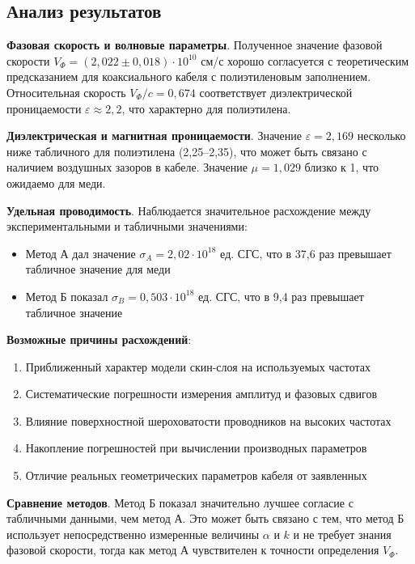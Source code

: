 \documentclass[a4paper]{article}
\begin{document}
\subsection*{Анализ результатов}

\textbf{Фазовая скорость и волновые параметры}. Полученное значение фазовой скорости $V_\Phi = (2,022 \pm 0,018) \cdot 10^{10}$ см/с хорошо согласуется с теоретическим предсказанием для коаксиального кабеля с полиэтиленовым заполнением. Относительная скорость $V_\Phi/c = 0,674$ соответствует диэлектрической проницаемости $\varepsilon \approx 2,2$, что характерно для полиэтилена.

\textbf{Диэлектрическая и магнитная проницаемости}. Значение $\varepsilon = 2,169$ несколько ниже табличного для полиэтилена (2,25--2,35), что может быть связано с наличием воздушных зазоров в кабеле. Значение $\mu = 1,029$ близко к 1, что ожидаемо для меди.

\textbf{Удельная проводимость}. Наблюдается значительное расхождение между экспериментальными и табличными значениями:
\begin{itemize}
\item Метод А дал значение $\sigma_A = 2,02 \cdot 10^{18}$ ед. СГС, что в 37,6 раз превышает табличное значение для меди
\item Метод Б показал $\sigma_B = 0,503 \cdot 10^{18}$ ед. СГС, что в 9,4 раз превышает табличное значение
\end{itemize}

\textbf{Возможные причины расхождений}:
\begin{enumerate}
\item Приближенный характер модели скин-слоя на используемых частотах
\item Систематические погрешности измерения амплитуд и фазовых сдвигов
\item Влияние поверхностной шероховатости проводников на высоких частотах
\item Накопление погрешностей при вычислении производных параметров
\item Отличие реальных геометрических параметров кабеля от заявленных
\end{enumerate}

\textbf{Сравнение методов}. Метод Б показал значительно лучшее согласие с табличными данными, чем метод А. Это может быть связано с тем, что метод Б использует непосредственно измеренные величины $\alpha$ и $k$ и не требует знания фазовой скорости, тогда как метод А чувствителен к точности определения $V_\Phi$.
\end{document}
